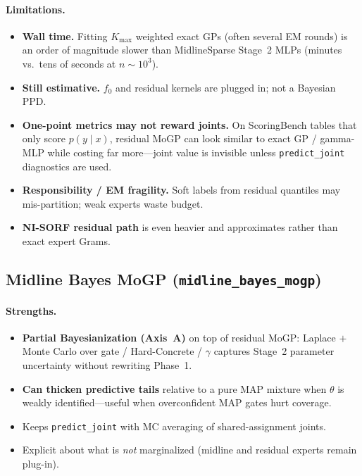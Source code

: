 \documentclass[11pt,a4paper]{article}
\newcommand{\Kmax}{K_{\max}}
\theoremstyle{definition}
\begin{document}
\paragraph{Limitations.}
\begin{itemize}[leftmargin=1.2em,itemsep=2pt]
\item \textbf{Wall time.} Fitting $\Kmax$ weighted exact GPs (often several EM
  rounds) is an order of magnitude slower than MidlineSparse Stage~2 MLPs
  (minutes vs.\ tens of seconds at $n\sim 10^3$).
\item \textbf{Still estimative.} $f_0$ and residual kernels are plugged in; not a
  Bayesian PPD.
\item \textbf{One-point metrics may not reward joints.} On ScoringBench tables
  that only score $p(y\mid x)$, residual MoGP can look similar to exact GP /
  gamma-MLP while costing far more---joint value is invisible unless
  \texttt{predict\_joint} diagnostics are used.
\item \textbf{Responsibility / EM fragility.} Soft labels from residual
  quantiles may mis-partition; weak experts waste budget.
\item \textbf{NI-SORF residual path} is even heavier and approximates rather than
  exact expert Grams.
\end{itemize}

\subsection{Midline Bayes MoGP (\texttt{midline\_bayes\_mogp})}
\label{sec:bayes-sl}

\paragraph{Strengths.}
\begin{itemize}[leftmargin=1.2em,itemsep=2pt]
\item \textbf{Partial Bayesianization (Axis~A)} on top of residual MoGP: Laplace
  $+$ Monte Carlo over gate / Hard-Concrete / $\gamma$ captures Stage~2 parameter
  uncertainty without rewriting Phase~1.
\item \textbf{Can thicken predictive tails} relative to a pure MAP mixture when
  $\theta$ is weakly identified---useful when overconfident MAP gates hurt
  coverage.
\item Keeps \texttt{predict\_joint} with MC averaging of shared-assignment joints.
\item Explicit about what is \emph{not} marginalized (midline and residual
  experts remain plug-in).
\end{itemize}
\end{document}
